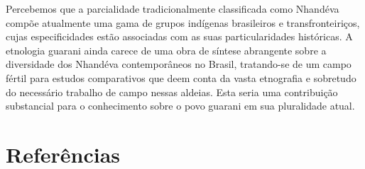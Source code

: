 

Percebemos que a parcialidade tradicionalmente classificada como
Nhandéva compõe atualmente uma gama de grupos indígenas brasileiros e
transfronteiriços, cujas especificidades estão associadas com as suas
particularidades históricas. A etnologia guarani ainda carece de uma
obra de síntese abrangente sobre a diversidade dos Nhandéva
contemporâneos no Brasil, tratando-se de um campo fértil para estudos
comparativos que deem conta da vasta etnografia e sobretudo do
necessário trabalho de campo nessas aldeias. Esta seria uma
contribuição substancial para o conhecimento sobre o povo guarani em
sua pluralidade atual. 

\section{Referências}

